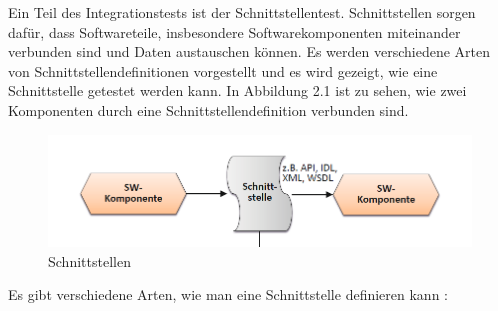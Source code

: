 Ein Teil des Integrationstests ist der Schnittstellentest. Schnittstellen sorgen dafür, dass
Softwareteile, insbesondere Softwarekomponenten miteinander verbunden sind und Daten austauschen können.
Es werden verschiedene Arten von Schnittstellendefinitionen vorgestellt und es wird gezeigt, wie eine 
Schnittstelle getestet werden kann.
In Abbildung 2.1 ist zu sehen, wie zwei Komponenten durch eine Schnittstellendefinition verbunden sind.\par
\begin{figure}[!h]
\centering
\includegraphics[scale=.9,]{Bilder/Quicktest/Schnittstelle.png}
\caption{Schnittstellen \parencite[S.218]{integration}}\label{fig:schnitt}
\end{figure}
Es gibt verschiedene Arten, wie man eine Schnittstelle definieren kann \parencite[S. 218 ff.]{integration}:
